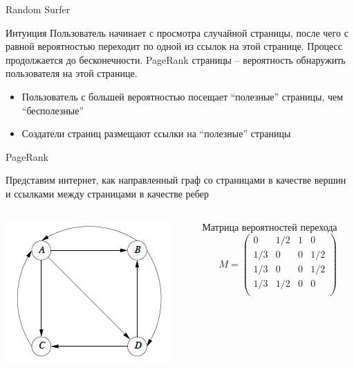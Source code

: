 \documentclass[10pt,a4paper]{beamer}
\begin{document}
\begin{frame}{Random Surfer}

\begin{block}{Интуиция}
Пользователь начинает с просмотра случайной страницы, после чего с равной вероятностью переходит по одной из ссылок на этой странице. Процесс продолжается до бесконечности. PageRank страницы -- вероятность обнаружить пользователя на этой странице.
\end{block}

\begin{itemize}
\item Пользователь с большей вероятностью посещает ``полезные'' страницы, чем ``бесполезные''
\item Создатели страниц размещают ссылки на ``полезные'' страницы
\end{itemize}

\end{frame}


\begin{frame}{PageRank}

Представим интернет, как направленный граф со страницами в качестве вершин и ссылками между страницами в качестве ребер

\vspace{2em}
\begin{columns}[C]
	\begin{column}{.5\textwidth}
    \includegraphics[scale=0.60]{images/pr1.png}
	\end{column}
    \begin{column}{.5\textwidth}
    Матрица вероятностей перехода
    \[
    M = \begin{pmatrix}
    0 & 1/2 & 1 & 0 \\
    1/3 & 0 & 0 & 1/2 \\
    1/3 & 0 & 0 & 1/2 \\
    1/3 & 1/2 & 0 & 0 \\
    \end{pmatrix}
    \]        
    \end{column}    
\end{columns}

\end{frame}
\end{document}
